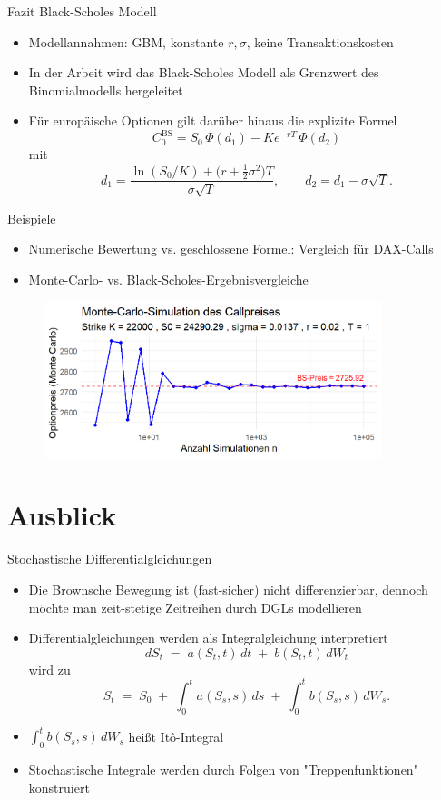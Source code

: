 \documentclass{beamer}
\begin{document}
\begin{frame}{Fazit Black-Scholes Modell}
  \begin{itemize}
      \item Modellannahmen: GBM, konstante $r,\sigma$, keine Transaktionskosten
      \item In der Arbeit wird das Black-Scholes Modell als Grenzwert des Binomialmodells hergeleitet
      \item Für europäische Optionen gilt darüber hinaus die explizite Formel
      $$C_0^{\mathrm{BS}}= S_0\,\Phi(d_1) - K e^{-rT}\,\Phi(d_2)$$ mit
      $$
d_1 = \frac{\ln(S_0/K) + \big(r + \tfrac12 \sigma^2\big)T}{\sigma \sqrt{T}},
\qquad
d_2 = d_1 - \sigma \sqrt{T}.
$$
  \end{itemize}
\end{frame}

\begin{frame}{Beispiele}
  \begin{itemize}
      \item Numerische Bewertung vs. geschlossene Formel: Vergleich für DAX-Calls
      \item Monte-Carlo- vs. Black-Scholes-Ergebnisvergleiche
  \end{itemize}
  \begin{figure}
    \centering
  \includegraphics[width=0.88\textwidth]{../thesis/images/call_dax_mc.png}
  \end{figure}
\end{frame}

\section{Ausblick}

\begin{frame}{Stochastische Differentialgleichungen}
  \begin{itemize}
    \item Die Brownsche Bewegung ist (fast-sicher) nicht differenzierbar, dennoch möchte man zeit-stetige Zeitreihen durch DGLs modellieren
    \item Differentialgleichungen werden als Integralgleichung interpretiert
    $$dS_t \;=\; a(S_t,t)\,dt \;+\; b(S_t,t)\,dW_t
$$
wird zu
$$
S_t \;=\; S_0 \;+\; \int_0^t a(S_s,s)\,ds \;+\; \int_0^t b(S_s,s)\,dW_s.
$$
  \item $\int_0^t b(S_s,s)\,dW_s$ heißt It\^o-Integral
  \item Stochastische Integrale werden durch Folgen von "Treppenfunktionen" konstruiert
  \end{itemize}
\end{frame}
\end{document}
